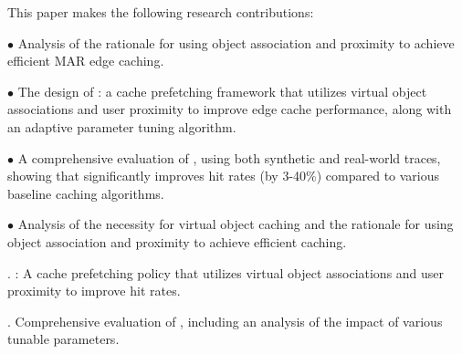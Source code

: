 
    This paper makes the following research contributions:
    
    \noindent$\bullet$ Analysis of %
    the rationale for using object association and proximity to achieve efficient MAR edge caching.
    
    \noindent$\bullet$ The design of \spaarc{}: a cache prefetching framework that utilizes virtual object associations and user proximity to improve edge cache performance, along with an adaptive parameter tuning algorithm.
    
    \noindent$\bullet$ A comprehensive evaluation of \spaarc{}, using both synthetic and real-world traces, showing that \spaarc{} significantly improves hit rates (by 3-40\%) compared to various baseline caching algorithms.



    \noindent$\bullet$ Analysis of the necessity for virtual object caching and the rationale for using object association and proximity to achieve efficient caching.
    
    . \spaarc{}: A cache prefetching policy that utilizes virtual object associations and user proximity to improve hit rates.
    
    . Comprehensive evaluation of \spaarc{}, including an analysis of the impact of various tunable parameters.

